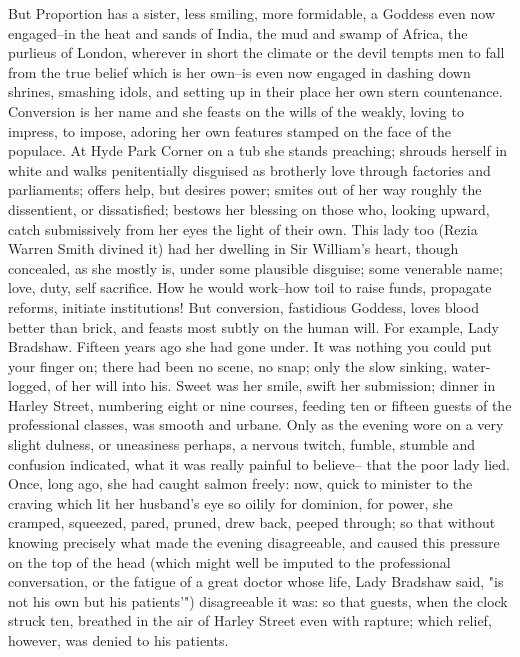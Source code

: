 \documentclass[lang=cn,10pt]{elegantbook}
\begin{document}
But Proportion has a sister, less smiling, more formidable, a
Goddess even now engaged--in the heat and sands of India, the mud
and swamp of Africa, the purlieus of London, wherever in short the
climate or the devil tempts men to fall from the true belief which
is her own--is even now engaged in dashing down shrines, smashing
idols, and setting up in their place her own stern countenance.
Conversion is her name and she feasts on the wills of the weakly,
loving to impress, to impose, adoring her own features stamped on
the face of the populace.  At Hyde Park Corner on a tub she stands
preaching; shrouds herself in white and walks penitentially
disguised as brotherly love through factories and parliaments;
offers help, but desires power; smites out of her way roughly the
dissentient, or dissatisfied; bestows her blessing on those who,
looking upward, catch submissively from her eyes the light of their
own.  This lady too (Rezia Warren Smith divined it) had her
dwelling in Sir William's heart, though concealed, as she mostly
is, under some plausible disguise; some venerable name; love, duty,
self sacrifice.  How he would work--how toil to raise funds,
propagate reforms, initiate institutions!  But conversion,
fastidious Goddess, loves blood better than brick, and feasts most
subtly on the human will.  For example, Lady Bradshaw.  Fifteen
years ago she had gone under.  It was nothing you could put your
finger on; there had been no scene, no snap; only the slow sinking,
water-logged, of her will into his.  Sweet was her smile, swift her
submission; dinner in Harley Street, numbering eight or nine
courses, feeding ten or fifteen guests of the professional classes,
was smooth and urbane.  Only as the evening wore on a very slight
dulness, or uneasiness perhaps, a nervous twitch, fumble, stumble
and confusion indicated, what it was really painful to believe--
that the poor lady lied.  Once, long ago, she had caught salmon
freely: now, quick to minister to the craving which lit her
husband's eye so oilily for dominion, for power, she cramped,
squeezed, pared, pruned, drew back, peeped through; so that without
knowing precisely what made the evening disagreeable, and caused
this pressure on the top of the head (which might well be imputed
to the professional conversation, or the fatigue of a great doctor
whose life, Lady Bradshaw said, "is not his own but his patients'")
disagreeable it was: so that guests, when the clock struck ten,
breathed in the air of Harley Street even with rapture; which
relief, however, was denied to his patients.
\end{document}
